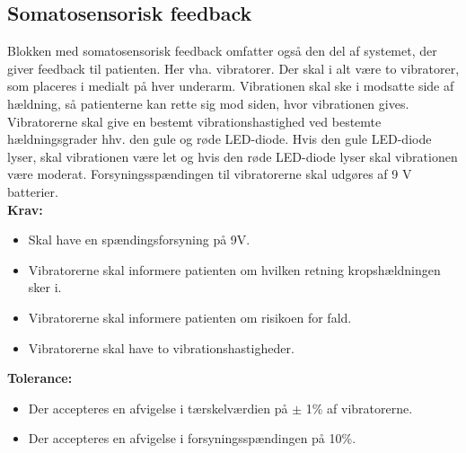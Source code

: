 \subsection{Somatosensorisk feedback} 
Blokken med somatosensorisk feedback omfatter også den del af systemet, der giver feedback til patienten. Her vha. vibratorer. Der skal i alt være to vibratorer, som placeres i medialt på hver underarm. Vibrationen skal ske i modsatte side af hældning, så patienterne kan rette sig mod siden, hvor vibrationen gives. Vibratorerne skal give en bestemt vibrationshastighed ved bestemte hældningsgrader hhv. den gule og røde LED-diode. Hvis den gule LED-diode lyser, skal vibrationen være let og hvis den røde LED-diode lyser skal vibrationen være moderat. Forsyningsspændingen til vibratorerne skal udgøres af 9 V batterier.
\\
\textbf{Krav:}
\begin{itemize}
	\item Skal have en spændingsforsyning på 9V.
	\item Vibratorerne skal informere patienten om hvilken retning kropshældningen sker i.
	\item Vibratorerne skal informere patienten om risikoen for fald.
	\item Vibratorerne skal have to vibrationshastigheder.
\end{itemize}
\textbf{Tolerance:}
\begin{itemize}
	\item Der accepteres en afvigelse i tærskelværdien på $\pm$ 1\% af vibratorerne.
	\item Der accepteres en afvigelse i forsyningsspændingen på 10\%.
\end{itemize}

